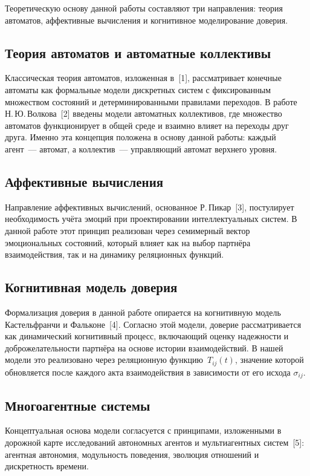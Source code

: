 \documentclass[12pt]{article}
\begin{document}
Теоретическую основу данной работы составляют три направления: теория автоматов, аффективные вычисления и когнитивное моделирование доверия.

\subsection*{Теория автоматов и автоматные коллективы}
Классическая теория автоматов, изложенная в~[1], рассматривает конечные автоматы как формальные модели дискретных систем с фиксированным множеством состояний и детерминированными правилами переходов. В работе Н.\,Ю.\,Волкова~[2] введены модели автоматных коллективов, где множество автоматов функционирует в общей среде и взаимно влияет на переходы друг друга. Именно эта концепция положена в основу данной работы: каждый агент~--- автомат, а коллектив~--- управляющий автомат верхнего уровня.

\subsection*{Аффективные вычисления}
Направление аффективных вычислений, основанное Р.\,Пикар~[3], постулирует необходимость учёта эмоций при проектировании интеллектуальных систем. В данной работе этот принцип реализован через семимерный вектор эмоциональных состояний, который влияет как на выбор партнёра взаимодействия, так и на динамику реляционных функций.

\subsection*{Когнитивная модель доверия}
Формализация доверия в данной работе опирается на когнитивную модель Кастельфранчи и Фальконе~[4]. Согласно этой модели, доверие рассматривается как динамический когнитивный процесс, включающий оценку надежности и доброжелательности партнёра на основе истории взаимодействий. В нашей модели это реализовано через реляционную функцию~$T_{ij}(t)$, значение которой обновляется после каждого акта взаимодействия в зависимости от его исхода $\sigma_{ij}$.

\subsection*{Многоагентные системы}
Концептуальная основа модели согласуется с принципами, изложенными в дорожной карте исследований автономных агентов и мультиагентных систем~[5]: агентная автономия, модульность поведения, эволюция отношений и дискретность времени.
\end{document}
